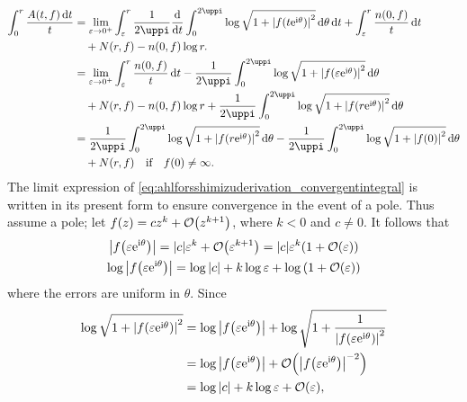 \begin{align}
    \int_0^r\frac{A(t,f)\dd{t}}t & =\lim_{\varepsilon\to 0^+}\int_\varepsilon^r\frac{1}{2\uppi}\dv{t}\int_0^{2\uppi}\log\sqrt{1+\abs{f\qty(t\ee^{\ii\theta})}^2}\dd{\theta}\ddt+\int_\varepsilon^r\frac{n(0,f)}{t}\ddt\nonumber \\
    & \quad+N(r,f)-n(0,f)\log r.\nonumber                                                                                                                                                          \\
    & =\lim_{\varepsilon\to 0^+}\int_\varepsilon^r\frac{n(0,f)}{t}\ddt-\frac{1}{2\uppi}\int_0^{2\uppi}\log\sqrt{1+\abs{f\qty(\varepsilon\ee^{\ii\theta})}^2}\dd{\theta}\nonumber                   \\
    & \quad+N(r,f)-n(0,f)\log r+\frac{1}{2\uppi}\int_0^{2\uppi}\log\sqrt{1+\abs{f\qty(r\ee^{\ii\theta})}^2}\dd{\theta}\label{eq:ahlforsshimizuderivation_convergentintegral}                       \\
    & =\frac1{2\uppi}\int_0^{2\uppi}\log\sqrt{1+\abs{f\qty(r\ee^{\ii\theta})}^2}\dd{\theta}-\frac1{2\uppi}\int_0^{2\uppi}\log\sqrt{1+\abs{f(0)}^2}\dd{\theta}\nonumber                             \\
    & \quad+N(r,f)\qq{if}f(0)\neq\infty.\label{eq:ahlforsshimizuderivation_regularcase}
\end{align}
The limit expression of \cref{eq:ahlforsshimizuderivation_convergentintegral} is written in its present form to ensure convergence in the event of a pole. Thus assume a pole; let \(f(z)=cz^k+\order{z^{k+1}}\), where \(k<0\) and \(c\neq 0\). It follows that
\begin{gather*}
    \abs{f\qty(\varepsilon\ee^{\ii\theta})}=\abs{c}\varepsilon^k+\order{\varepsilon^{k+1}}=\abs{c}\varepsilon^k\qty(1+\order{\varepsilon})\\
    \log\abs{f\qty(\varepsilon\ee^{\ii\theta})}=\log\abs{c}+k\log\varepsilon+\log\qty(1+\order{\varepsilon})
\end{gather*} where the errors are uniform in \(\theta\). Since
\begin{align*}
    \log\sqrt{1+\abs{f\qty(\varepsilon\ee^{\ii\theta})}^2} & =\log\abs{f\qty(\varepsilon\ee^{\ii\theta})}+\log\sqrt{1+\frac1{\abs{f\qty(\varepsilon\ee^{\ii\theta})}^2}} \\
    & =\log\abs{f\qty(\varepsilon\ee^{\ii\theta})}+\order{\abs{f\qty(\varepsilon\ee^{\ii\theta})}^{-2}}           \\
    & =\log\abs{c}+k\log\varepsilon+\order{\varepsilon},
\end{align*}
